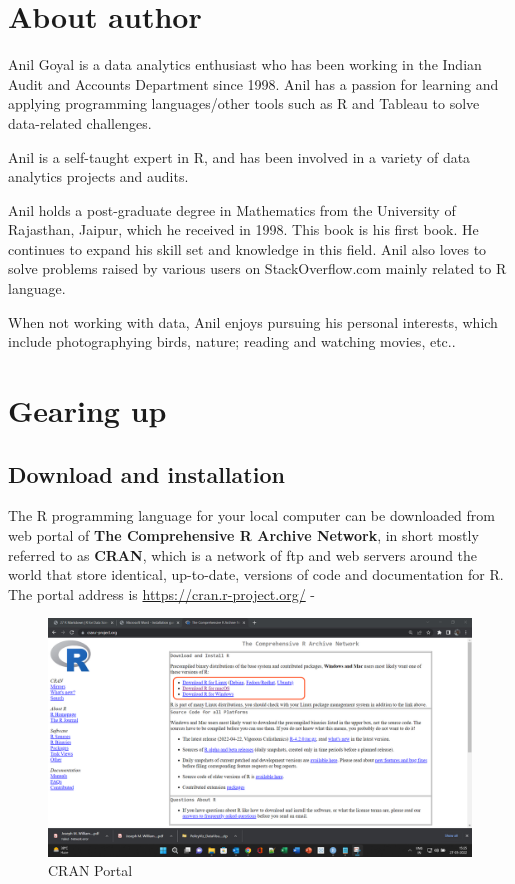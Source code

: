 \documentclass[
]{book}
\begin{document}
\hypertarget{about-author}{%
\chapter*{About author}\label{about-author}}

Anil Goyal is a data analytics enthusiast who has been working in the Indian Audit and Accounts Department since 1998. Anil has a passion for learning and applying programming languages/other tools such as R and Tableau to solve data-related challenges.

Anil is a self-taught expert in R, and has been involved in a variety of data analytics projects and audits.

Anil holds a post-graduate degree in Mathematics from the University of Rajasthan, Jaipur, which he received in 1998. This book is his first book. He continues to expand his skill set and knowledge in this field. Anil also loves to solve problems raised by various users on StackOverflow.com mainly related to R language.

When not working with data, Anil enjoys pursuing his personal interests, which include photographying birds, nature; reading and watching movies, etc..

\mainmatter

\hypertarget{gearing-up}{%
\chapter*{Gearing up}\label{gearing-up}}

\hypertarget{download-and-installation}{%
\section{Download and installation}\label{download-and-installation}}

The R programming language for your local computer can be downloaded from web portal of \textbf{The Comprehensive R Archive Network}, in short mostly referred to as \textbf{CRAN}, which is a network of ftp and web servers around the world that store identical, up-to-date, versions of code and documentation for R. The portal address is \url{https://cran.r-project.org/} -

\begin{figure}

{\centering \includegraphics[width=0.6\linewidth]{images/CRAN} 

}

\caption{CRAN Portal}\label{fig:cranportal}
\end{figure}
\end{document}
